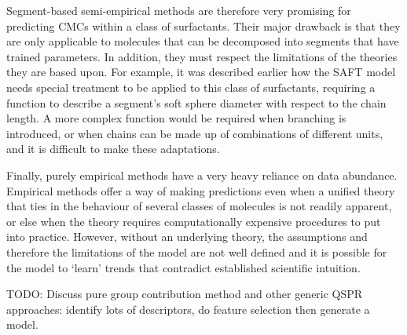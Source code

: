 Segment-based semi-empirical methods are therefore very promising for predicting
CMCs within a class of surfactants. Their major drawback is that they are only
applicable to molecules that can be decomposed into segments that have trained
parameters. In addition, they must respect the limitations of the theories they
are based upon. For example, it was described earlier how the SAFT model needs
special treatment to be applied to this class of surfactants, requiring a
function to describe a segment's soft sphere diameter with respect to the chain
length. A more complex function would be required when branching is introduced,
or when chains can be made up of combinations of different units, and it is
difficult to make these adaptations.

Finally, purely empirical methods have a very heavy reliance on data abundance.
Empirical methods offer a way of making predictions even when a unified theory
that ties in the behaviour of several classes of molecules is not readily
apparent, or else when the theory requires computationally expensive procedures
to put into practice. However, without an underlying theory, the assumptions and
therefore the limitations of the model are not well defined and it is possible
for the model to `learn' trends that contradict established scientific
intuition.



TODO: Discuss pure group contribution method and other generic QSPR approaches:
identify lots of descriptors, do feature selection then generate a model.
